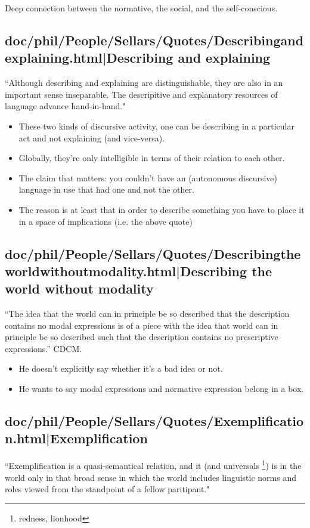 \documentclass[12pt,a4paper]{report}
\begin{document}
Deep connection between the normative, the social, and the self-conscious.
\subsection{doc/phil/People/Sellars/Quotes/Describingandexplaining.html|Describing and explaining}
``Although describing and explaining are distinguishable, they are also in an
important sense inseparable. The descripitive and explanatory resources of
language advance hand-in-hand."

\begin{itemize}
    \item  These two kinds of discursive activity, one can be describing in a
           particular act and not explaining (and vice-versa).
    \item Globally, they're only intelligible in terms of their relation to
          each other.
    \item The claim that matters: you couldn't have an  (autonomous discursive)
          language in use that had one and not the other.
    \item The reason is at least that in order to describe something you have
          to place it in a space of implications (i.e. the above quote)
\end{itemize}
\subsection{doc/phil/People/Sellars/Quotes/Describingtheworldwithoutmodality.html|Describing the world without modality}
``The idea that the world can in principle be so described that the description
contains no modal expressions is of a piece with the idea that world can in
principle be so described such that the description contains no prescriptive
expressions.'' CDCM.

\begin{itemize}
    \item He doesn't explicitly say whether it's a bad idea or not.
    \item He wants to say modal expressions and normative expression belong in
          a box.
\end{itemize}
\subsection{doc/phil/People/Sellars/Quotes/Exemplification.html|Exemplification}
``Exemplification is a quasi-semantical relation, and it (and universals
\footnote{redness, lionhood}) is in the world only in that broad sense in which the
world includes linguistic norms and roles viewed from the standpoint of a
fellow paritipant."
\end{document}
